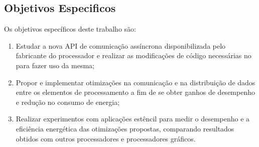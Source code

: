 \subsection{Objetivos Especificos}
\label{subsec:objetivos-específicos}

Os objetivos específicos deste trabalho são: 

\begin{enumerate}
\item Estudar a nova API de comunicação assíncrona disponibilizada pelo fabricante do processador e realizar as modificações de código necessárias no \pskel para fazer uso da mesma;
\item Propor e implementar otimizações na comunicação e na distribuição de dados entre os elementos de processamento a fim de se obter ganhos de desempenho e redução no consumo de energia;
\item Realizar experimentos com aplicações estêncil para medir o desempenho e a eficiência energética das otimizações propostas, comparando resultados obtidos com outros processadores \multicore e processadores gráficos.
\end{enumerate}